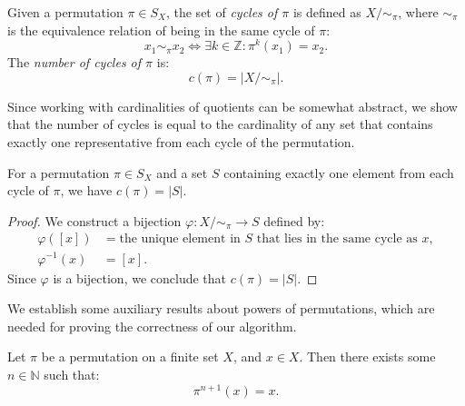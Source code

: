 \begin{definition}
  \label{def:numCyclesOfPerm}
  \leanok
  Given a permutation $\pi \in S_X$, the set of \emph{cycles of $\pi$} is defined as $X / \sim_\pi$, where $\sim_\pi$ is the equivalence relation of being in the same cycle of $\pi$:
  \begin{equation*}
    x_1 \sim_\pi x_2 \iff \exists k \in \mathbb{Z}: \pi^k(x_1) = x_2.
  \end{equation*}
  The \emph{number of cycles of $\pi$} is:
  \begin{equation*}
    c(\pi) = |X / \sim_\pi|.
  \end{equation*}
\end{definition}

Since working with cardinalities of quotients can be somewhat abstract, we show that the number of cycles is equal to the cardinality of any set that contains exactly one representative from each cycle of the permutation.

\begin{proposition}
  \label{prop:numCyclesOfPerm-eq-card}
  \leanok
  For a permutation $\pi \in S_X$ and a set $S$ containing exactly one element from each cycle of $\pi$, we have $c(\pi) = |S|$.
\end{proposition}

\begin{proof}
  \leanok
  We construct a bijection $\varphi : X / \sim_\pi \to S$ defined by:
  \begin{align*}
    \varphi([x]) &= \text{the unique element in } S \text{ that lies in the same cycle as } x,\\
    \varphi^{-1}(x) &= [x].
  \end{align*}
  Since $\varphi$ is a bijection, we conclude that $c(\pi) = |S|$.
\end{proof}

We establish some auxiliary results about powers of permutations, which are needed for proving the correctness of our algorithm.

\begin{proposition}
  \label{prop:exists-perm-pow}
  \leanok
  Let $\pi$ be a permutation on a finite set $X$, and $x \in X$. Then there exists some $n \in \mathbb{N}$ such that:
  \begin{equation*}
    \pi^{n + 1}(x) = x.
  \end{equation*}
\end{proposition}

